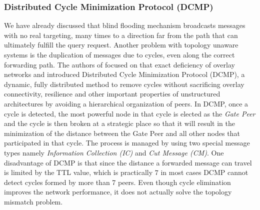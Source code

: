 \subsubsection{Distributed Cycle Minimization Protocol (DCMP)}
We have already discussed that blind flooding mechanism broadcasts messages with
no real targeting, many times to a direction far from the path that can
ultimately fulfill the query request. Another problem with topology unaware
systems is the duplication of messages due to cycles, even along the correct
forwarding path. The authors of \cite{ZKB2008} focused on that exact deficiency
of overlay networks and introduced Distributed Cycle Minimization Protocol
(DCMP), a dynamic, fully distributed method to remove cycles without sacrificing
overlay connectivity, resilience and other important properties of unstructured
architectures by avoiding a hierarchical organization of peers. In DCMP, once a
cycle is detected, the most powerful node in that cycle is elected as the
\emph{Gate Peer} and the cycle is then broken at a strategic place so that it
will result in the minimization of the distance between the Gate Peer and all
other nodes that participated in that cycle. The process is managed by using two
special message types namely \emph{Information Collection (IC)} and \emph{Cut
Message (CM)}. One disadvantage of DCMP is that since the distance a forwarded
message can travel is limited by the TTL value, which is practically $7$ in most
cases DCMP cannot detect cycles formed by more than 7 peers. Even though cycle
elimination improves the network performance, it does not actually solve the
topology mismatch problem.

